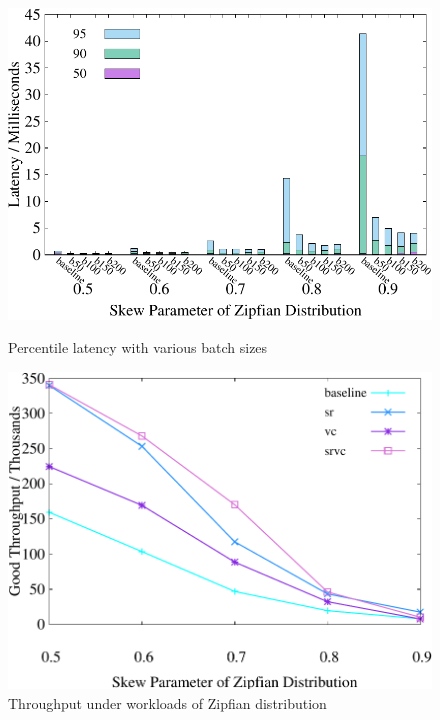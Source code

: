 \begin{figure}[t]
    \centering
    \begin{minipage}[b]{0.32\linewidth}
        \centering
        \includegraphics[width=\textwidth]{./exp_fig/bsize/percent95_latency}
        \vspace{-2em}
        \caption{Percentile latency with various batch sizes}
        \label{fig:bsize:p95}
    \end{minipage}
    \begin{minipage}[b]{0.32\linewidth}
            \centering
            \includegraphics[width=\textwidth]{./exp_fig/basic/tps}
            \vspace{-2em}
            \caption{Throughput under workloads of Zipfian distribution}

\end{minipage}
\end{figure}
